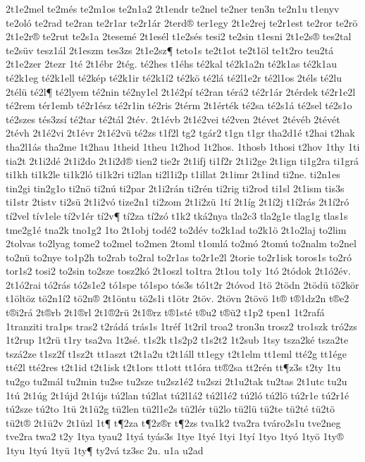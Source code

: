 {2t1e2mel
te2més
te2m1os
te2n1a2
2t1endr
te2nel
te2ner
ten3n
te2n1u
t1enyv
te2oló
te2rad
te2ran
te2r1ar
te2r1ár
2terd®
ter1egy
2t1e2rej
te2r1est
te2ror
te2rö
2t1e2r®
te2rut
te2s1a
2tesemé
2t1esél
t1e2sés
tesi2
te2sin
t1esni
2t1e2s®
tes2tal
te2süv
tesz1ál
2t1eszm
tes3zs
2t1e2sz¶
teto1s
te2t1ot
te2t1öl
te1t2ro
teu2tá
2t1e2zer
2tezr
1té
2t1ébr
2tég.
té2hes
t1éhs
té2kal
té2k1a2n
té2k1as
té2k1au
té2k1eg
té2k1ell
té2kép
té2k1ir
té2k1í2
té2kö
té2lá
té2l1e2r
té2l1os
2téls
té2lu
2télü
té2l¶
té2lyem
té2nin
té2ny1el
2t1é2pí
té2ran
térá2
té2r1ár
2térdek
té2r1e2l
té2rem
tér1emb
té2r1ész
té2r1in
té2ris
2térm
2t1érték
té2sa
té2s1á
té2sel
té2s1o
té2szes
tés3zsí
té2tar
té2tál
2tév.
2t1évb
2t1é2vei
té2ven
2tévet
2tévéb
2tévét
2tévh
2t1é2vi
2t1évr
2t1é2vü
té2zs
t1f2l
tg2
tgár2
t1gn
t1gr
tha2d1é
t2hai
t2hak
tha2l1ás
tha2me
1t2hau
1theid
1theu
1t2hod
1t2hos.
1thosb
1thosi
t2hov
1thy
1ti
tia2t
2t1i2dé
2t1i2do
2t1i2d®
tien2
tie2r
2t1ifj
ti1f2r
2t1i2ge
2t1ign
ti1g2ra
ti1grá
ti1kh
ti1k2le
ti1k2ló
ti1k2ri
ti2lan
ti2l1i2p
t1illat
2t1imr
2t1ind
ti2ne.
ti2n1es
tin2gi
tin2g1o
ti2nö
ti2nú
ti2par
2t1i2rán
ti2rén
ti2rig
ti2rod
ti1sl
2t1ism
tis3s
ti1str
2tistv
ti2sü
2t1i2vó
tize2n1
ti2zom
2t1i2zü
1tí
2t1íg
2t1í2j
t1í2rás
2t1í2ró
tí2vel
tív1ele
tí2v1ér
tí2v¶
tí2za
tí2zó
t1k2
tká2nya
tla2c3
tla2g1e
tlag1g
tlas1s
tme2g1é
tna2k
tno1g2
1to
2t1obj
todé2
to2dév
to2k1ad
to2k1ö
2t1o2laj
to2lim
2tolvas
to2lyag
tome2
to2mel
to2men
2toml
t1omlá
to2mó
2tomú
to2nalm
to2nel
to2nü
to2nye
to1p2h
to2rab
to2ral
to2r1as
to2r1e2l
2torie
to2r1isk
toros1s
to2ró
tor1s2
tosi2
to2sin
to2sze
tosz2kó
2t1oszl
to1tra
2t1ou
to1y
1tó
2tódok
2t1ó2év.
2t1ó2rai
tó2rás
tó2s1e2
tó1spe
tó1spo
tós3s
tó1t2r
2tóvod
1tö
2tödn
2tödü
tö2kör
t1öltöz
tö2n1í2
tö2n®
2t1öntu
tö2s1i
t1ötr
2töv.
2tövn
2tövö
1t®
t®1dz2n
t®e2
t®i2rá
2t®rb
2t1®rl
2t1®2rü
2t1®rz
t®1sté
t®u2
t®ü2
t1p2
tpen1
1t2rafá
1tranziti
tra1ps
tras2
t2rádá
trás1s
1tréf
1t2ril
troa2
tron3n
trosz2
tro1szk
tró2zs
1t2rup
1t2rü
t1ry
tsa2va
1t2sé.
t1s2k
t1s2p2
t1s2t2
1t2sub
1tsy
tsza2ké
tsza2te
tszá2ze
t1sz2f
t1sz2t
tt1aszt
t2t1a2u
t2t1áll
tt1egy
t2t1elm
tt1eml
tté2g
tt1ége
tté2l
tté2res
t2t1id
t2t1isk
t2t1ors
tt1ott
tt1óra
tt®2sa
tt2rén
tt¶z3s
t2ty
1tu
tu2go
tu2mál
tu2min
tu2se
tu2sze
tu2sz1é2
tu2szi
2t1u2tak
tu2tas
2t1utc
tu2u
1tú
2t1úg
2t1újd
2t1újs
tú2lan
tú2lat
tú2l1á2
tú2l1é2
tú2ló
tú2lö
tú2r1e
tú2r1é
tú2sze
tú2to
1tü
2t1ü2g
tü2len
tü2l1e2s
tü2lér
tü2lo
tü2lü
tü2te
tü2té
tü2tö
tü2t®
2t1ü2v
2t1üzl
1t¶
t¶2za
t¶2z®r
t¶2zs
tva1k2
tva2ra
tváro2s1u
tve2neg
tve2ra
twa2
t2y
1tya
tyau2
1tyá
tyás3s
1tye
1tyé
1tyi
1tyí
1tyo
1tyó
1työ
1ty®
1tyu
1tyú
1tyü
1ty¶
ty2vá
tz3sc
2u.
u1a
u2ad
}
